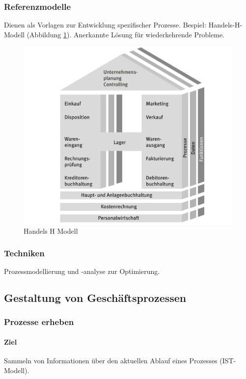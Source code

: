     \subsubsection*{Referenzmodelle}
        Dienen als Vorlagen zur Entwicklung spezifischer Prozesse. Bespiel: Handels-H-Modell (Abbildung \ref{fig:Handels-H-Modell}). Anerkannte Lösung für wiederkehrende Probleme.
        \begin{figure}[h]
            \centering
            \includegraphics[width=\textwidth]{image/Handels-H-Modell.png}
            \caption{Handels H Modell}
            \label{fig:Handels-H-Modell}
        \end{figure}
    \subsubsection*{Techniken}
        Prozessmodellierung und -analyse zur Optimierung.

\subsection{Gestaltung von Geschäftsprozessen}
    \subsubsection{Prozesse erheben}
        \paragraph*{Ziel}
            Sammeln von Informationen über den aktuellen Ablauf eines Prozesses (IST-Modell).
